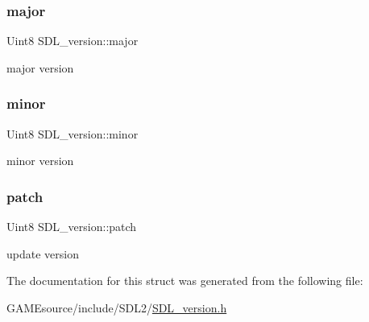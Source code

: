 \subsubsection{\texorpdfstring{major}{major}}
{\footnotesize\ttfamily Uint8 S\+D\+L\+\_\+version\+::major}

major version \mbox{\label{struct_s_d_l__version_a6c35c7bf80245028d5970e6a504ecf57}} 
\subsubsection{\texorpdfstring{minor}{minor}}
{\footnotesize\ttfamily Uint8 S\+D\+L\+\_\+version\+::minor}

minor version \mbox{\label{struct_s_d_l__version_aa6dacff18edee8cd037c773b843be0f1}} 
\subsubsection{\texorpdfstring{patch}{patch}}
{\footnotesize\ttfamily Uint8 S\+D\+L\+\_\+version\+::patch}

update version 

The documentation for this struct was generated from the following file\+:\begin{DoxyCompactItemize}
\item 
G\+A\+M\+Esource/include/\+S\+D\+L2/\mbox{\hyperlink{_s_d_l__version_8h}{S\+D\+L\+\_\+version.\+h}}\end{DoxyCompactItemize}
